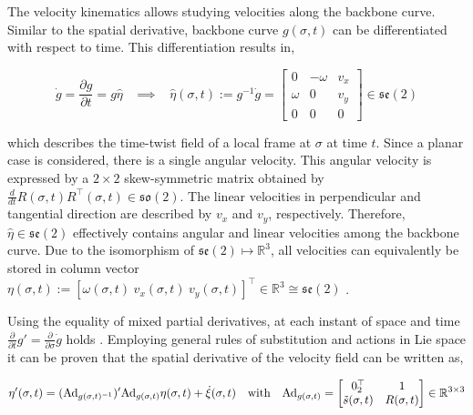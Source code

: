 The velocity kinematics allows studying velocities along the backbone curve. Similar to the spatial derivative, backbone curve $g(\sigma,t)$ can be differentiated with respect to time. This differentiation results in, 

\begin{equation}
  \Dot{g} = \frac{\partial g}{\partial t} = g \hat{\eta} \hspace{10pt} \implies \hspace{10pt}  \hat{\eta}(\sigma,t) := g^{-1}\dot{g} = \begin{bmatrix} 0 & -\omega & v_x \\ \omega & 0 & v_y \\
  0& 0 & 0 \end{bmatrix} \in  \mathfrak{se}(2)
    \label{eq2:dgdt}
\end{equation}

which describes the time-twist field of a local frame at $\sigma$ at time $t$. Since a planar case is considered, there is a single angular velocity. This angular velocity is expressed by a $2 \times 2$ skew-symmetric matrix obtained by $\frac{d}{dt}R(\sigma,t)R^\top(\sigma,t) \in \mathfrak{so}(2)$. The linear velocities in perpendicular and tangential direction are described by $v_x$ and $v_y$, respectively. Therefore, $\hat{\eta} \in \mathfrak{se}(2)$ effectively contains angular and linear velocities among the backbone curve. Due to the isomorphism of $\mathfrak{se}(2) \longmapsto \mathbb{R}^3$, all velocities can equivalently be stored in column vector $\eta(\sigma,t) := [\omega(\sigma,t) \hspace{3pt} v_x(\sigma,t) \hspace{3pt} v_y(\sigma,t)]^\top \in \mathbb{R}^3 \cong \mathfrak{se}(2)$ \cite{Sola2018}.


Using the equality of mixed partial derivatives, at each instant of space and time $\frac{\partial}{\partial t}g' = \frac{\partial}{\partial \sigma}\dot{g}$ holds \cite{Caasenbrood2020}. Employing general rules of substitution and actions in Lie space it can be proven that the spatial derivative of the velocity field can be written as,

\begin{equation}
    \eta'(\sigma,t)= (\text{Ad}_{g(\sigma,t)^{-1}})'\text{Ad}_{g(\sigma,t)} \eta(\sigma,t) + \Dot{\xi}(\sigma,t) \hspace{10pt} \text{with} \hspace{10pt} \text{Ad}_{g(\sigma,t)} = \begin{bmatrix} 0_2^\top & 1 \\ \Tilde{s}(\sigma,t) & R(\sigma,t)  \end{bmatrix} \in \mathbb{R}^{3\times 3}
    \label{eq2:etadif}
\end{equation}


